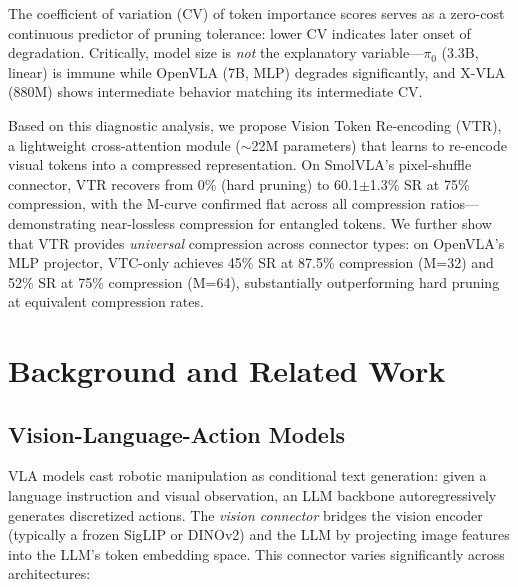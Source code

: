 \documentclass[letterpaper]{article}
\begin{document}
The coefficient of variation (CV) of token importance scores serves as a zero-cost continuous predictor of pruning tolerance: lower CV indicates later onset of degradation. Critically, model size is \emph{not} the explanatory variable---$\pi_0$ (3.3B, linear) is immune while OpenVLA (7B, MLP) degrades significantly, and X-VLA (880M) shows intermediate behavior matching its intermediate CV.

Based on this diagnostic analysis, we propose Vision Token Re-encoding (VTR), a lightweight cross-attention module ($\sim$22M parameters) that learns to re-encode visual tokens into a compressed representation. On SmolVLA's pixel-shuffle connector, VTR recovers from 0\% (hard pruning) to 60.1$\pm$1.3\% SR at 75\% compression, with the M-curve confirmed flat across all compression ratios---demonstrating near-lossless compression for entangled tokens. We further show that VTR provides \emph{universal} compression across connector types: on OpenVLA's MLP projector, VTC-only achieves 45\% SR at 87.5\% compression (M=32) and 52\% SR at 75\% compression (M=64), substantially outperforming hard pruning at equivalent compression rates.

\section{Background and Related Work}

\subsection{Vision-Language-Action Models}

VLA models cast robotic manipulation as conditional text generation: given a language instruction and visual observation, an LLM backbone autoregressively generates discretized actions. The \emph{vision connector} bridges the vision encoder (typically a frozen SigLIP or DINOv2) and the LLM by projecting image features into the LLM's token embedding space. This connector varies significantly across architectures:
\end{document}
